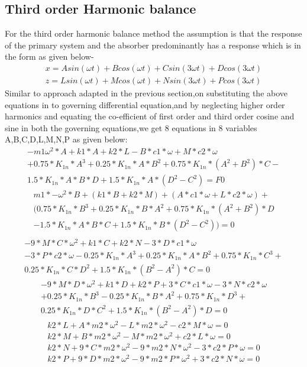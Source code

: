 \subsection{Third order Harmonic balance}
For the third order harmonic balance method the  assumption is that the response of the primary system and the absorber  predominantly has a response which is in the form as given below-
\begin{align}
x=Asin(\omega t)+Bcos(\omega t)+Csin(3\omega t)+Dcos(3\omega t)\\
z=Lsin(\omega t)+Mcos(\omega t)+Nsin(3\omega t)+Pcos(3\omega t)
\end{align}
Similar to approach adapted in the previous section,on substituting the above equations in to governing differential equation,and by neglecting higher order harmonics and equating the co-efficient of first order and third order cosine and sine in both the governing equations,we get 8 equations in 8 variables A,B,C,D,L,M,N,P as given below:
\begin{multline}
-m1\omega^2*A+k1*A+k2*L-B*c1*\omega+M*c2*\omega\\+0.75*K_{1n}*A^3+0.25*K_{1n}*A*B^2+ 0.75*K_{1n}*(A^2+B^2)*C-\\ 1.5*K_{1n}*A*B*D+1.5*K_{1n}*A*(D^2-C^2)=F0 
\end{multline}
\begin{multline}
 m1*-\omega^2*B+(k1*B+k2*M)+(A*c1*\omega+L*c2*\omega)+\\(0.75*K_{1n}*B^3+0.25*K_{1n}*B*A^2+0.75*K_{1n}*(A^2+B^2)*D\\-1.5*K_{1n}*A*B*C+1.5*K_{1n}*B*(D^2-C^2))=0 \\
\end{multline}
\begin{multline}
-9*M*C*\omega^2+k1*C+k2*N-3*D*c1*\omega\\-3*P*c2*\omega-0.25*K_{1n}*A^3+0.25*K_{1n}*A*B^2+0.75*K_{1n}*C^3+\\0.25*K_{1n}*C*D^2+1.5*K_{1n}*(B^2-A^2)*C=0
\end{multline}
\begin{multline}
-9*M*D*\omega^2+k1*D+k2*P+3*C*c1*\omega-3*N*c2*\omega\\+0.25*K_{1n}*B^3-0.25*K_{1n}*B*A^2+0.75*K_{1n}*D^3+\\0.25*K_{1n}*D*C^2+1.5*K_{1n}*(B^2-A^2)*D=0
\end{multline}
\begin{align}
k2*L+A*m2*\omega^2-L*m2*\omega^2-c2*M*\omega=0 \\
k2*M+B*m2*\omega^2-M*m2*\omega^2+c2*L*\omega=0 \\
k2*N+9*C*m2*\omega^2-9*m2*N*\omega^2-3*c2*P*\omega=0 \\
k2*P+9*D*m2*\omega^2-9*m2*P*\omega^2+3*c2*N*\omega=0
\end{align}

